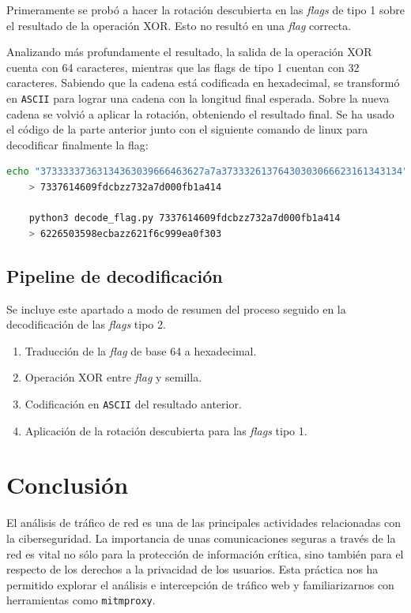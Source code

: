 \documentclass[]{article}
\begin{document}
Primeramente se probó a hacer la rotación descubierta en las \textit{flags} de tipo 1 sobre el resultado de la operación XOR. Esto no resultó en una \textit{flag} correcta.

Analizando más profundamente el resultado, la salida de la operación XOR cuenta con 64 caracteres, mientras que las flags de tipo 1 cuentan con 32 caracteres. Sabiendo que la cadena está codificada en hexadecimal, se transformó en \texttt{ASCII} para lograr una cadena con la longitud final esperada. Sobre la nueva cadena se volvió a aplicar la rotación, obteniendo el resultado final. Se ha usado el código de la parte anterior junto con el siguiente comando de linux para decodificar finalmente la flag:


\lstset{style=bash}
\begin{lstlisting}[language=bash, caption=Optención de la flag en claro]
    echo "37333337363134363039666463627a7a37333261376430303066623161343134" | xxd -r -p
    > 7337614609fdcbzz732a7d000fb1a414

    python3 decode_flag.py 7337614609fdcbzz732a7d000fb1a414
    > 6226503598ecbazz621f6c999ea0f303
\end{lstlisting}

\subsection{Pipeline de decodificación}

Se incluye este apartado a modo de resumen del proceso seguido en la decodificación de las \textit{flags} tipo 2.

\begin{enumerate}
    \item Traducción de la \textit{flag} de base 64 a hexadecimal.
    \item Operación XOR entre \textit{flag} y semilla.
    \item Codificación en \texttt{ASCII} del resultado anterior.
    \item Aplicación de la rotación descubierta para las \textit{flags} tipo 1.
\end{enumerate}

\section{Conclusión}
\label{sec:conclusion}
El análisis de tráfico de red es una de las principales actividades relacionadas con la ciberseguridad. La importancia de unas comunicaciones seguras a través de la red es vital no sólo para la protección de información crítica, sino también para el respecto de los derechos a la privacidad de los usuarios. Esta práctica nos ha permitido explorar el análisis e intercepción de tráfico web y familiarizarnos con herramientas como \texttt{mitmproxy}.
\end{document}

